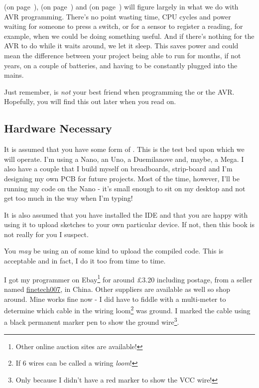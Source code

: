  (on page~\pageref{avr-interrupts}),  (on page~\pageref{avr-timers}) and  (on page~\pageref{avr-sleep-modes}) will figure largely in what we do with AVR programming. There's no point wasting time, CPU cycles and power waiting for someone to press a switch, or for a sensor to register a reading, for example, when we could be doing something useful. And if there's nothing for the AVR to do while it waits around, we let it sleep. This saves power and could mean the difference between your project being able to run for months, if not years, on a couple of batteries, and having to be constantly plugged into the mains.

Just remember,  is \emph{not} your best friend when programming the   or the AVR. Hopefully, you will find this out later when you read on.

\subsection{Hardware Necessary}\label{hardware-necessary}

It is assumed that you have some form of . This is the test bed upon which we will operate. I'm using a Nano, an Uno, a Duemilanove and, maybe, a Mega. I also have a couple that I build myself on breadboards, strip-board and I'm designing my own PCB for future projects. Most of the time, however, I'll be running my code on the Nano - it's small enough to sit on my desktop and not get too much in the way when I'm typing!

It is also assumed that you have installed the  IDE and that you are happy with using it to upload sketches to your own particular device. If not, then this book is not really for you I suspect.

You \emph{may} be using an  of some kind to upload the compiled code. This is acceptable and in fact, I do it too from time to time.

I got my programmer on Ebay\footnote{Other online auction sites are available!} for around £3.20 including postage, from a seller named \href{http://stores.ebay.co.uk/finetech007}{finetech007}, in China. Other suppliers are available as well so shop around. Mine works fine now - I did have to fiddle with a multi-meter to determine which cable in the wiring loom\footnote{If 6 wires can be called a wiring \emph{loom}!} was ground. I marked the cable using a black permanent marker pen to show the ground wire\footnote{Only because I didn't have a red marker to show the VCC wire!}.

